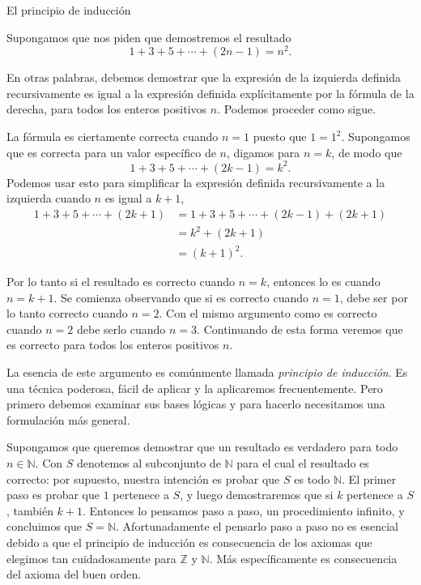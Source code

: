 \begin{section}{El principio de inducción}\label{seccion-principio-de-induccion}

Supongamos que nos piden que demostremos el resultado
\begin{equation}\label{eq-sumatoria-impares}
    1+3+5+\cdots+(2n-1) = n^2.
\end{equation}


En otras palabras, debemos demostrar que la expresión de la izquierda definida recursivamente es igual a la expresión definida explícitamente por la fórmula de la derecha, para todos los enteros positivos $n$. Podemos proceder como sigue.

La fórmula es ciertamente correcta cuando $n=1$ puesto que $1=1^2$.  Supongamos que es correcta para un valor específico de $n$, digamos para $n=k$, de modo que
$$
1+3+5+\cdots+(2k-1) = k^2.
$$
Podemos usar esto para simplificar la expresión definida recursivamente a la izquierda cuando $n$ es igual a $k+1$,
\begin{equation} \label{es-dem-sumatoria-impares}
    \begin{aligned}
        1+3+5+\cdots+(2k+1) &= 1+3+5+\cdots+(2k-1) +(2k+1) \\
        &=k^2 +(2k+1) \\
        &=(k+1)^2.
    \end{aligned}
\end{equation}


Por lo tanto si el resultado es correcto cuando $n=k$, entonces lo es cuando $n=k+1$. Se comienza observando que si es correcto cuando $n=1$, debe ser por lo tanto correcto cuando $n=2$. Con el mismo argumento como es correcto cuando $n=2$ debe serlo cuando $n=3$. Continuando de esta forma veremos que es correcto para todos los enteros positivos $n$.

La esencia de este argumento es comúnmente llamada \textit{principio de inducción}. Es una técnica poderosa, fácil de aplicar y la aplicaremos frecuentemente. Pero primero debemos examinar sus bases lógicas y para hacerlo necesitamos una formulación más general. 

Supongamos que queremos demostrar que un resultado es verdadero para todo $n \in \mathbb N$. Con $S$ denotemos al subconjunto de $\mathbb N$ para el cual el resultado es correcto: por supuesto, nuestra intención es probar que $S$ es todo $\mathbb N$. El primer paso es probar que $1$ pertenece a $S$, y luego demostraremos que si $k$ pertenece a $S$, también $k+1$. Entonces lo pensamos paso a paso, un procedimiento infinito, y concluimos que $S=\mathbb N$. Afortunadamente el pensarlo paso a paso no es esencial debido a que el principio de inducción es consecuencia de los axiomas que elegimos tan cuidadosamente para $\mathbb Z$ y $\mathbb N$. Más específicamente es consecuencia del axioma del buen orden.


\end{section}
